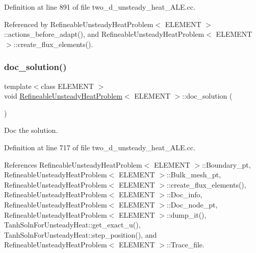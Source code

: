 Definition at line 891 of file two\+\_\+d\+\_\+unsteady\+\_\+heat\+\_\+\+A\+L\+E.\+cc.



Referenced by Refineable\+Unsteady\+Heat\+Problem$<$ E\+L\+E\+M\+E\+N\+T $>$\+::actions\+\_\+before\+\_\+adapt(), and Refineable\+Unsteady\+Heat\+Problem$<$ E\+L\+E\+M\+E\+N\+T $>$\+::create\+\_\+flux\+\_\+elements().

\mbox{\label{classRefineableUnsteadyHeatProblem_a77d590171785b6b5f4070af9401c0e37}} 
\subsubsection{\texorpdfstring{doc\+\_\+solution()}{doc\_solution()}}
{\footnotesize\ttfamily template$<$class E\+L\+E\+M\+E\+NT $>$ \\
void \hyperlink{classRefineableUnsteadyHeatProblem}{Refineable\+Unsteady\+Heat\+Problem}$<$ E\+L\+E\+M\+E\+NT $>$\+::doc\+\_\+solution (\begin{DoxyParamCaption}{ }\end{DoxyParamCaption})}



Doc the solution. 



Definition at line 717 of file two\+\_\+d\+\_\+unsteady\+\_\+heat\+\_\+\+A\+L\+E.\+cc.



References Refineable\+Unsteady\+Heat\+Problem$<$ E\+L\+E\+M\+E\+N\+T $>$\+::\+Boundary\+\_\+pt, Refineable\+Unsteady\+Heat\+Problem$<$ E\+L\+E\+M\+E\+N\+T $>$\+::\+Bulk\+\_\+mesh\+\_\+pt, Refineable\+Unsteady\+Heat\+Problem$<$ E\+L\+E\+M\+E\+N\+T $>$\+::create\+\_\+flux\+\_\+elements(), Refineable\+Unsteady\+Heat\+Problem$<$ E\+L\+E\+M\+E\+N\+T $>$\+::\+Doc\+\_\+info, Refineable\+Unsteady\+Heat\+Problem$<$ E\+L\+E\+M\+E\+N\+T $>$\+::\+Doc\+\_\+node\+\_\+pt, Refineable\+Unsteady\+Heat\+Problem$<$ E\+L\+E\+M\+E\+N\+T $>$\+::dump\+\_\+it(), Tanh\+Soln\+For\+Unsteady\+Heat\+::get\+\_\+exact\+\_\+u(), Tanh\+Soln\+For\+Unsteady\+Heat\+::step\+\_\+position(), and Refineable\+Unsteady\+Heat\+Problem$<$ E\+L\+E\+M\+E\+N\+T $>$\+::\+Trace\+\_\+file.



